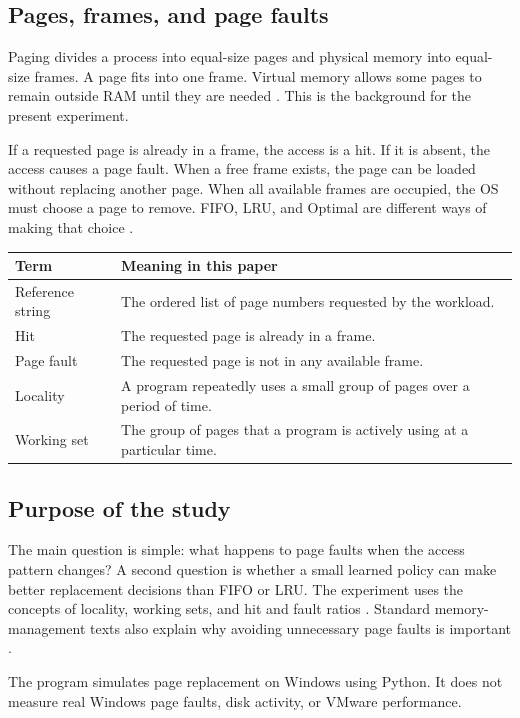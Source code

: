 \documentclass[11pt,a4paper]{article}
\begin{document}
\subsection{Pages, frames, and page faults}
Paging divides a process into equal-size pages
and physical memory into equal-size frames. A page fits into one frame. Virtual
memory allows some pages to remain outside RAM until they are needed
\cite{osc}. This is the background for the present experiment.

If a requested page is already in a frame, the access is a hit. If it is absent,
the access causes a page fault. When a free frame exists, the page can be loaded
without replacing another page. When all available frames are occupied, the OS
must choose a page to remove. FIFO, LRU, and Optimal
are different ways of making that choice \cite{ostep}.

\begin{center}
\begin{tabular}{|p{3cm}|p{10cm}|}\hline
Term & Meaning in this paper \\ \hline
Reference string & The ordered list of page numbers requested by the workload. \\ \hline
Hit & The requested page is already in a frame. \\ \hline
Page fault & The requested page is not in any available frame. \\ \hline
Locality & A program repeatedly uses a small group of pages over a period of time. \\ \hline
Working set & The group of pages that a program is actively using at a particular time. \\ \hline
\end{tabular}
\end{center}

\subsection{Purpose of the study}
The main question is simple: what happens to page faults when the access pattern
changes? A second question is whether a small learned policy can make better
replacement decisions than FIFO or LRU. The experiment uses the concepts
of locality, working sets, and hit and fault ratios \cite{osc,ostep}.
Standard memory-management texts also explain why avoiding unnecessary page
faults is important \cite{ostep,osc}.

The program simulates page replacement on Windows using Python. It does not
measure real Windows page faults, disk activity, or VMware performance.
\end{document}
